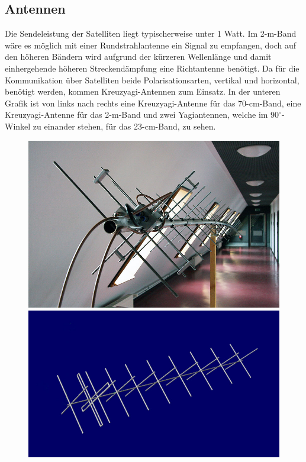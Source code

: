\subsection{Antennen}
Die Sendeleistung der Satelliten liegt typischerweise unter 1 Watt. Im 2-m-Band wäre es möglich mit einer Rundstrahlantenne ein Signal zu empfangen, 
doch auf den höheren Bändern wird aufgrund der kürzeren Wellenlänge und damit einhergehende höheren Streckendämpfung eine Richtantenne benötigt. 
Da für die Kommunikation über Satelliten beide Polarisationsarten, vertikal und horizontal, benötigt werden, kommen Kreuzyagi-Antennen zum Einsatz.  
In der unteren Grafik ist von links nach rechts eine Kreuzyagi-Antenne für das 70-cm-Band, eine Kreuzyagi-Antenne für das 2-m-Band und zwei 
Yagiantennen, welche im 90$^\circ$-Winkel zu einander stehen, für das 23-cm-Band, zu sehen. 
\begin{figure}[h]
	\centering
	\begin{minipage}[t]{0.3\textwidth}
		\includegraphics[width=\textwidth]{images/antenne}
	\end{minipage}
	\begin{minipage}[t]{0.34\textwidth}
		\includegraphics[width=\textwidth]{images/antenne2}

\end{minipage}
\end{figure}
